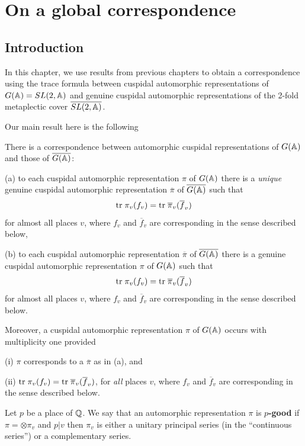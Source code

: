 \chapter{On a global correspondence}

\section{Introduction}
In this chapter, we use results from previous chapters
to obtain a correspondence using the trace
formula between cuspidal automorphic representations of
$G({\Bbb {A}})=SL(2,{\Bbb {A}})$ and genuine cuspidal
automorphic representations of the 2-fold
metaplectic cover $\overline{SL(2,{\Bbb {A}})}$.

Our main result here is the following

\begin{theorem}
There is a correspondence between automorphic cuspidal representations
of $G({\Bbb A})$ and those of $\overline{G({\Bbb A})}$:

(a) to each cuspidal automorphic representation $\pi $ of $G({\Bbb A})$
there is a {\em unique} genuine cuspidal automorphic
representation $\overline{\pi }$ of
$\overline{G({\Bbb A})}$ such that 
\[
{\rm tr}\;\pi _v(f_v)={\rm tr}\;\overline{\pi }_v(\overline{f}_v)
\]
for almost all places $v$, where $f_v$ and $\overline{f}_v$ are
corresponding in the sense described below,

(b) to each cuspidal automorphic representation
$\overline{\pi }$ of $\overline{G({\Bbb A})}$ there
is a genuine cuspidal automorphic
representation $\pi $ of $G({\Bbb A})$ such that 
\[
{\rm tr}\;\pi _v(f_v)={\rm tr}\;\overline{\pi }_v(\overline{f}_v)
\]
for almost all places $v$, where $f_v$ and $\overline{f}_v$ are
corresponding in the sense described below.

Moreover, a cuspidal automorphic representation $\pi $ of $G({\Bbb A})$
occurs with multiplicity one provided

(i) $\pi $ corresponds to a $\overline{\pi }$ as in (a), and

(ii) ${\rm tr}\;\pi _v(f_v)={\rm tr}\;\overline{\pi }_v(\overline{f}_v)$,
for {\em all} places $v$, where $f_v$ and $\overline{f}_v$
are corresponding in the sense described below.
\end{theorem}

\begin{definition} Let $p$ be a place of ${\Bbb{Q}}$.
We say that an automorphic representation
$\pi$ is {\bf $p$-good}
if $\pi=\otimes \pi_v$ and $p|v$ then $\pi_v$ is
either a unitary principal series (in the ``continuous series'') or
a complementary series.
\end{definition}

